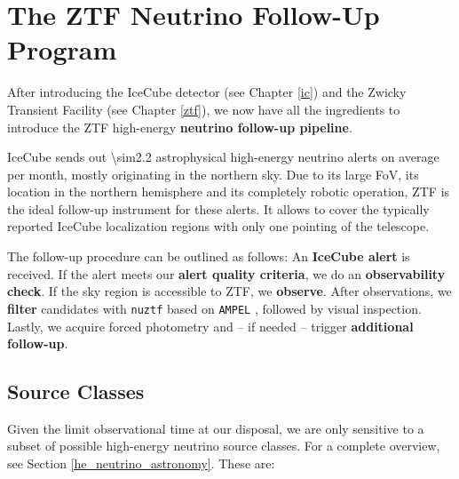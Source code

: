 \chapter{The ZTF Neutrino Follow-Up Program} \label{fupipeline}
After introducing the IceCube detector (see Chapter \ref{ic}) and the Zwicky Transient Facility (see Chapter \ref{ztf}), we now have all the ingredients to introduce the ZTF high-energy \textbf{neutrino follow-up pipeline}.

IceCube sends out \num{\sim2.2} astrophysical high-energy neutrino alerts on average per month, mostly originating in the northern sky. Due to its large FoV, its location in the northern hemisphere and its completely robotic operation, ZTF is the ideal follow-up instrument for these alerts. It allows to cover the typically reported IceCube localization regions with only one pointing of the telescope.

The follow-up procedure can be outlined as follows: An \textbf{IceCube alert} is received. If the alert meets our \textbf{alert quality criteria}, we do an \textbf{observability check}. If the sky region is accessible to ZTF, we \textbf{observe}. After observations, we \textbf{filter} candidates with \texttt{nuztf} based on \texttt{AMPEL} , followed by visual inspection. Lastly, we acquire forced photometry and -- if needed -- trigger \textbf{additional follow-up}.

\section{Source Classes}
Given the limit observational time at our disposal, we are only sensitive to a subset of possible high-energy neutrino source classes. For a complete overview, see Section \ref{he_neutrino_astronomy}. These are:


